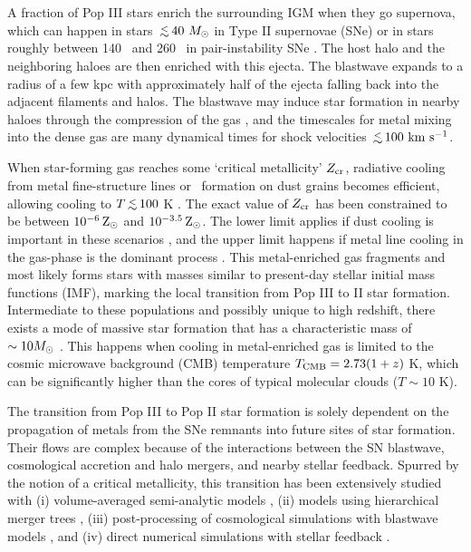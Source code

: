 \documentclass[useAMS,usenatbib]{mn2e}
\begin{document}
A fraction of Pop III stars enrich the surrounding IGM when
they go supernova, which can happen in stars $\lsim 40~\Ms$ in Type II
supernovae (SNe) or in stars roughly between 140 \Ms~and 260 \Ms~in
pair-instability SNe \citep[PISNe;][]{2002ApJ...567..532H}. The host
halo and the neighboring haloes are then enriched with this ejecta.
The blastwave expands to a radius of a few kpc \citep{Bromm03_SN,
  Wise08_Gal, Greif10} with approximately half of the ejecta falling
back into the adjacent filaments and halos.  The blastwave may induce
star formation in nearby haloes through the compression of the gas
\citep{Shapiro87, Ferrara98, Mackey03}, and the timescales for metal
mixing into the dense gas are many dynamical times \citep{Cen08} for
shock velocities $\lsim 100~\kms$.

When star-forming gas reaches some `critical metallicity' $Z_{\rm
  cr}$, radiative cooling from metal fine-structure lines or
\hh~formation on dust grains becomes efficient, allowing cooling to $T
\lsim 100$ K \citep{Omukai05}.  The exact value of $Z_{\rm cr}$ has
been constrained to be between $10^{-6} {\rm\,Z_\odot}$ and $10^{-3.5} {\rm\,Z_\odot}$.
The lower limit applies if dust cooling is important in these
scenarios \citep{Omukai05, Schneider06_Frag, clark08}, and the upper
limit happens if metal line cooling in the gas-phase is the dominant
process \citep{Bromm01, 2009ApJ...691..441S}.  This metal-enriched gas
fragments and most likely forms stars with masses similar to
present-day stellar initial mass functions (IMF), marking the local
transition from Pop III to II star formation.  Intermediate to
these populations and possibly unique to high redshift, there exists a
mode of massive star formation that has a characteristic mass of $\sim
10 \Ms$ \citep{Larson98, Tumlinson07_IMF, 2009ApJ...691..441S}.  This
happens when cooling in metal-enriched gas is limited to the cosmic
microwave background (CMB) temperature $T_{\rm CMB} = 2.73 (1+z)$ K,
which can be significantly higher than the cores of typical molecular
clouds ($T \sim 10$ K).

The transition from Pop III to Pop II star formation is solely
dependent on the propagation of metals from the SNe remnants into
future sites of star formation.  Their flows are complex because of
the interactions between the SN blastwave, cosmological accretion and
halo mergers, and nearby stellar feedback.  Spurred by the notion of a
critical metallicity, this transition has been extensively studied
with (i) volume-averaged semi-analytic models \citep{Scannapieco03,
  Yoshida04, Furlanetto05_Reion}, (ii) models using hierarchical
merger trees \citep{Tumlinson06, Tumlinson10, Salvadori07, Komiya10},
(iii) post-processing of cosmological simulations with blastwave
models \citep{Karlsson08, Trenti09, Trenti10}, and (iv) direct
numerical simulations with stellar feedback \citep{Tornatore07,
  Ricotti08, Maio10_Pop32, Maio10_Enrich}.
\end{document}
